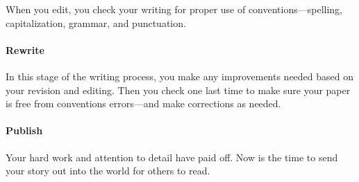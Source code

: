 When you edit, you check your writing for proper use of conventions—spelling, capitalization, grammar, and punctuation.

\paragraph{Rewrite}

In this stage of the writing process, you make any improvements needed based on your revision and editing. Then you check one last time to make sure your paper is free from conventions errors—and make corrections as needed.

\paragraph{Publish}

Your hard work and attention to detail have paid off. Now is the time to send your story out into the world for others to read.

\newpage
